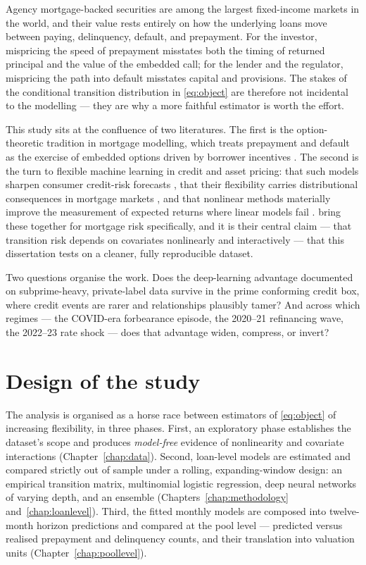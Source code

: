 Agency mortgage-backed securities are among the largest fixed-income markets in the world, and their value rests entirely on how the underlying loans move between paying, delinquency, default, and prepayment. For the investor, mispricing the speed of prepayment misstates both the timing of returned principal and the value of the embedded call; for the lender and the regulator, mispricing the path into default misstates capital and provisions. The stakes of the conditional transition distribution in \eqref{eq:object} are therefore not incidental to the modelling --- they are why a more faithful estimator is worth the effort.

This study sits at the confluence of two literatures. The first is the option-theoretic tradition in mortgage modelling, which treats prepayment and default as the exercise of embedded options driven by borrower incentives \citep{schwartz1989, deng2000}. The second is the turn to flexible machine learning in credit and asset pricing: that such models sharpen consumer credit-risk forecasts \citep{khandani2010}, that their flexibility carries distributional consequences in mortgage markets \citep{fuster2022}, and that nonlinear methods materially improve the measurement of expected returns where linear models fail \citep{gukellyxiu2020}. \citet{sirignano2021} bring these together for mortgage risk specifically, and it is their central claim --- that transition risk depends on covariates nonlinearly and interactively --- that this dissertation tests on a cleaner, fully reproducible dataset.

Two questions organise the work. Does the deep-learning advantage documented on subprime-heavy, private-label data survive in the prime conforming credit box, where credit events are rarer and relationships plausibly tamer? And across which regimes --- the COVID-era forbearance episode, the 2020--21 refinancing wave, the 2022--23 rate shock --- does that advantage widen, compress, or invert?

\section{Design of the study}
\label{sec:intro-design}

The analysis is organised as a horse race between estimators of
\eqref{eq:object} of increasing flexibility, in three phases.  First,
an exploratory phase establishes the dataset's scope and produces
\emph{model-free} evidence of nonlinearity and covariate interactions
(Chapter~\ref{chap:data}).  Second, loan-level models are estimated
and compared strictly out of sample under a rolling, expanding-window
design: an empirical transition matrix, multinomial logistic
regression, deep neural networks of varying depth, and an ensemble
(Chapters~\ref{chap:methodology} and~\ref{chap:loanlevel}).  Third, the
fitted monthly models are composed into twelve-month horizon
predictions and compared at the pool level --- predicted versus
realised prepayment and delinquency counts, and their translation
into valuation units (Chapter~\ref{chap:poollevel}).

